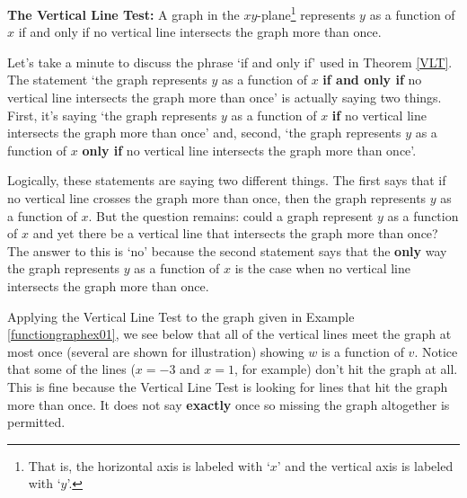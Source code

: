 \documentclass{ximera}
\begin{document}
\medskip


\begin{theorem}  \textbf{The Vertical Line Test:}   A graph in the $xy$-plane\footnote{That is, the horizontal axis is labeled with `$x$' and the vertical axis is labeled with `$y$'.}  represents $y$ as a function of $x$ if and only if no vertical line intersects the graph more than once.
\label{VLT}

\end{theorem}


\bigskip

Let's take a minute to discuss the phrase `if and only if' used in Theorem \ref{VLT}.   The statement `the graph represents $y$ as a function of $x$ \textbf{if and only if} no vertical line intersects the graph more than once' is actually saying two things.  First, it's saying `the graph represents $y$ as a function of $x$  \textbf{if} no vertical line intersects the graph more than once' and, second,  `the graph represents $y$ as a function of $x$  \textbf{only if} no vertical line intersects the graph more than once'.   

\medskip

Logically, these statements are saying two different things. The first says that if no vertical line crosses the graph more than once, then the graph represents $y$ as a function of $x$.  But the question remains:  could a graph represent $y$ as a function of $x$ and yet there be a vertical line that intersects the graph more than once?  The answer to this is `no' because the second statement says that the \textbf{only} way the graph represents $y$ as a function of $x$ is the case when no vertical line intersects the graph more than once.

\medskip

Applying the Vertical Line Test to the graph given in Example \ref{functiongraphex01}, we see below that all of the vertical lines meet the graph at most once (several are shown for illustration) showing $w$ is a function of $v$.  Notice that some of the lines ($x = -3$ and $x = 1$, for example) don't hit the graph at all.  This is fine because the Vertical Line Test is looking for lines that hit the graph more than once.  It does not say \textbf{exactly} once so missing the graph altogether is permitted.
\end{document}
